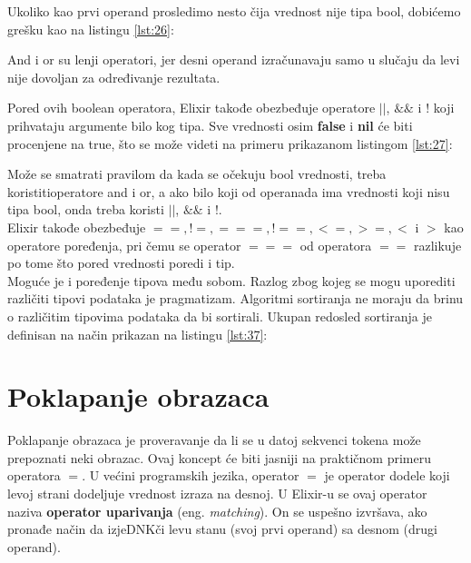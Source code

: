 \documentclass[12pt,oneside]{memoir}
\begin{document}


Ukoliko kao prvi operand prosledimo nesto čija vrednost nije tipa bool, dobićemo grešku kao na listingu \ref{lst:26}:



And i or su lenji operatori, jer desni operand izračunavaju samo u slučaju da levi nije dovoljan za određivanje rezultata.

Pored ovih boolean operatora, Elixir takođe obezbeđuje operatore $||$, $\&\&$ i $!$ koji prihvataju argumente bilo kog tipa. Sve vrednosti osim \textbf{false} i \textbf{nil} će biti procenjene na true, što se može videti na primeru prikazanom listingom \ref{lst:27}:



Može se smatrati pravilom da kada se očekuju bool vrednosti, treba koristitioperatore and i or, a ako bilo koji od operanada ima vrednosti koji nisu tipa bool, onda treba koristi $||$, $\&\&$ i $!$.\\

Elixir takođe obezbeđuje $==,! =, ===,! ==, <=,> =, <$ i $ >$ kao operatore poređenja, pri čemu se operator $===$ od operatora $==$ razlikuje po tome što pored vrednosti poredi i tip.\\

Moguće je i poređenje tipova među sobom. Razlog zbog kojeg se mogu uporediti različiti tipovi podataka je pragmatizam. Algoritmi sortiranja ne moraju da brinu o različitim tipovima podataka da bi sortirali. Ukupan redosled sortiranja je definisan na način prikazan na listingu \ref{lst:37}:



\newpage

\section{Poklapanje obrazaca}

Poklapanje obrazaca je proveravanje da li se u datoj sekvenci tokena može prepoznati neki obrazac. Ovaj koncept će biti jasniji na praktičnom primeru operatora $=$. U većini programskih jezika, operator $=$ je operator dodele koji levoj strani dodeljuje vrednost izraza na desnoj. U Elixir-u se ovaj operator naziva \textbf{operator uparivanja} (eng. \textit{matching}). On se uspešno izvršava, ako pronađe način da izjeDNKči levu stanu (svoj prvi operand) sa desnom (drugi operand).
\end{document}
